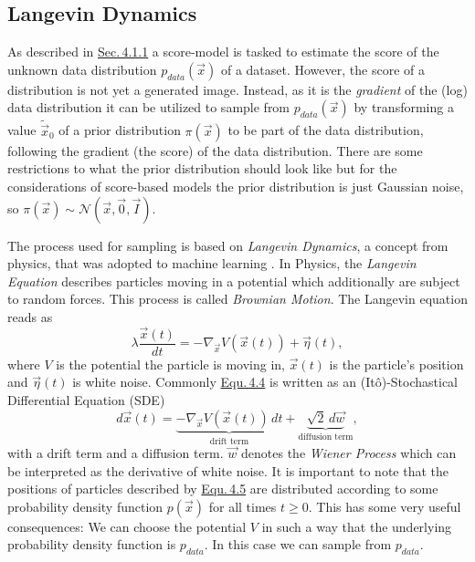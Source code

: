 \subsection{Langevin Dynamics} \label{sec:4.1.2}
As described in \hyperref[sec:4.1.1]{Sec.\,4.1.1} a score-model is tasked to estimate the score of the unknown data distribution $p_{data}(\vec{x})$ of a dataset. However, the score of a distribution is not yet a generated image. Instead, as it is the \textit{gradient} of the (log) data distribution it can be utilized to sample from $p_{data}(\vec{x})$ by transforming a value $\tilde{\vec{x}}_0$ of a prior distribution $\pi(\vec{x})$ to be part of the data distribution, following the gradient (the score) of the data distribution. There are some restrictions to what the prior distribution should look like but for the considerations of score-based models the prior distribution is just Gaussian noise, so $\pi(\vec{x})\sim\mathcal{N}(\vec{x}, \vec{0}, \vec{I})$.

The process used for sampling is based on \textit{Langevin Dynamics}, a concept from physics, that was adopted to machine learning \cite{langevin1, langevin2}. In Physics, the \textit{Langevin Equation} describes particles moving in a potential which additionally are subject to random forces. This process is called \textit{Brownian Motion}. The Langevin equation reads as 
%
\begin{equation} \label{equ:4.4}
    \lambda \frac{\vec{x}(t)}{dt}=-\nabla_{\vec{x}} V(\vec{x}(t))+\vec{\eta}(t),
\end{equation}
%
where $V$ is the potential the particle is moving in, $\vec{x}(t)$ is the particle's position and $\vec{\eta}(t)$ is white noise. Commonly \hyperref[equ:4.4]{Equ.\,4.4} is written as an (Itô)-Stochastical Differential Equation (SDE)
%
\begin{equation} \label{equ:4.5}
    d\vec{x}(t)=\underbrace{-\nabla_{\vec{x}} V(\vec{x}(t))\,dt}_\text{drift term}+\underbrace{\sqrt{2}\,d\vec{w}}_\text{diffusion term},
\end{equation}
%
with a drift term and a diffusion term. $\vec{w}$ denotes the \textit{Wiener Process} \cite{gardiner} which can be interpreted as the derivative of white noise. It is important to note that the positions of particles described by \hyperref[equ:4.5]{Equ.\,4.5} are distributed according to some probability density function $p(\vec{x})$ for all times $t\geq0$. This has some very useful consequences: We can choose the potential $V$ in such a way that the underlying probability density function is $p_{data}$. In this case we can sample from $p_{data}$.

